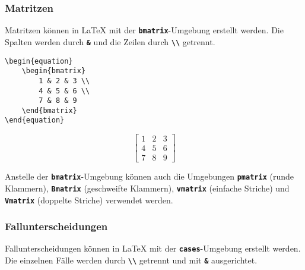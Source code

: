 \subsubsection{Matritzen}
Matritzen können in \LaTeX{} mit der \textbf{\texttt{bmatrix}}-Umgebung erstellt werden. Die Spalten werden durch \textbf{\texttt{\&}} und die Zeilen durch \textbf{\texttt{\textbackslash\textbackslash}} getrennt.

\begin{minipage}{0.5\textwidth}
    \begin{lstlisting}
\begin{equation}
    \begin{bmatrix}
        1 & 2 & 3 \\
        4 & 5 & 6 \\
        7 & 8 & 9
    \end{bmatrix}
\end{equation}
\end{lstlisting}
\end{minipage}
\hfill
\begin{minipage}{0.5\textwidth}
    \begin{equation}
        \begin{bmatrix}
            1 & 2 & 3 \\
            4 & 5 & 6 \\
            7 & 8 & 9
        \end{bmatrix}
    \end{equation}
\end{minipage}

Anstelle der \textbf{\texttt{bmatrix}}-Umgebung können auch die Umgebungen \textbf{\texttt{pmatrix}} (runde Klammern), \textbf{\texttt{Bmatrix}} (geschweifte Klammern), \textbf{\texttt{vmatrix}} (einfache Striche) und \textbf{\texttt{Vmatrix}} (doppelte Striche) verwendet werden.

\subsubsection{Fallunterscheidungen}
Fallunterscheidungen können in \LaTeX{} mit der \textbf{\texttt{cases}}-Umgebung erstellt werden. Die einzelnen Fälle werden durch \textbf{\texttt{\textbackslash\textbackslash}} getrennt und mit \textbf{\texttt{\&}} ausgerichtet.

